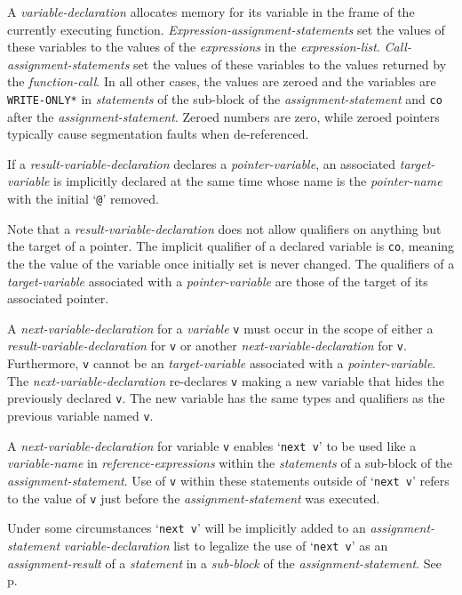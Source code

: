 \documentclass[12pt]{article}
\newcommand{\pagref}[1]{p\pageref{#1}}
\begin{document}
A {\em variable-declaration} allocates memory for its variable
in the frame of the currently executing function.
{\em Expression-assignment-statements} set the values of these variables
to the values of the {\em expressions} in the {\em expression-list}.
{\em Call-assignment-statements} set the values of these variables
to the values returned by the {\em function-call}.
In all other cases, the values are zeroed and the variables are
{\tt *WRITE-ONLY*} in {\em statements} of the sub-block of the
{\em assignment-statement} and {\tt co} after the
{\em assignment-statement}.
Zeroed numbers are zero, while zeroed pointers typically
cause segmentation faults when de-referenced.

If a {\em result-variable-declaration} declares a {\em pointer-variable},
an associated {\em target-variable} is implicitly declared at the same time
whose name is the {\em pointer-name} with the initial `{\tt @}' removed.

Note that a {\em result-variable-declaration} does not allow
qualifiers on anything but the target of a pointer.  The implicit
qualifier of a declared variable is {\tt co}, meaning the
the value of the variable once initially set is never changed.
The qualifiers of a {\em target-variable} associated with a
{\em pointer-variable} are those of the target of
its associated pointer.

A {\em next-variable-declaration} for a {\em variable} {\tt v}
must occur in the scope of either a {\em result-variable-declaration}
for {\tt v} or another {\em next-variable-declaration} for {\tt v}.
Furthermore, {\tt v} cannot be an {\em target-variable} associated
with a {\em pointer-variable}.
The {\em next-variable-declaration} re-declares {\tt v} making a new
variable that hides the previously declared {\tt v}.  The new variable
has the same types and qualifiers as the previous variable named {\tt v}.

A {\em next-variable-declaration} for variable {\tt v} enables
`{\tt next v}' to be used like a {\em variable-name}
in {\em reference-expressions} within the {\em statements}
of a sub-block of the {\em assignment-statement}.  Use of
{\tt v} within these statements outside of `{\tt next v}'
refers to the value of {\tt v} just
before the {\em assignment-statement} was executed.

Under some circumstances `{\tt next v}' will
be implicitly added to an {\em assignment-statement}
{\em variable-declaration} list to legalize the
use of `{\tt next v}' as an {\em assignment-result} of a {\em statement}
in a {\em sub-block} of the {\em assignment-statement}.
See \pagref{NEXT-PROMOTION}.
\end{document}

